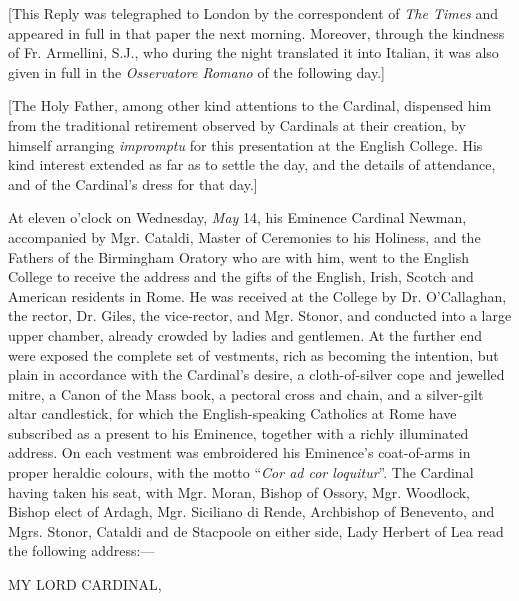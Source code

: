 [This Reply was telegraphed to London by the correspondent of \emph{The
Times} and appeared in full in that paper the next morning.
Moreover, through the kindness of Fr. Armellini, S.J., who during the
night translated it into Italian, it was also given in full in the \emph{Osservatore
Romano} of the following day.]


[The Holy Father, among other kind attentions to the Cardinal,
dispensed him from the traditional retirement observed by Cardinals at
their creation, by himself arranging \emph{impromptu} for this
presentation at the English College. His kind interest extended as far
as to settle the day, and the details of attendance, and of the
Cardinal's dress for that day.]

At eleven o'clock on Wednesday, \emph{May} 14, his Eminence
Cardinal Newman, accompanied by Mgr. Cataldi, Master of Ceremonies to
his Holiness, and the Fathers of the Birmingham Oratory who are with
him, went to the English College to receive the address and the gifts
of the English, Irish, Scotch and American residents in Rome. He was
received at the College by Dr. O'Callaghan, the rector, Dr. Giles, the
vice-rector, and Mgr. Stonor, and conducted into a large upper
chamber, already crowded by ladies and gentlemen. At the further end
were exposed the complete set of vestments, rich as becoming the
intention, but plain in accordance with the Cardinal's desire, a
cloth-of-silver cope and jewelled mitre, a Canon of the Mass book, a
pectoral cross and chain, and a silver-gilt altar candlestick, for
which the English-speaking Catholics at Rome have subscribed as a
present to his Eminence, together with a
richly illuminated address. On each vestment was embroidered his
Eminence's coat-of-arms in proper heraldic colours, with the motto
``\emph{Cor ad cor loquitur}''. The Cardinal having taken his
seat, with Mgr. Moran, Bishop of Ossory, Mgr. Woodlock, Bishop elect
of Ardagh, Mgr. Siciliano di Rende, Archbishop of Benevento, and Mgrs.
Stonor, Cataldi and de Stacpoole on either side, Lady Herbert of Lea
read the following address:—


MY LORD CARDINAL,

